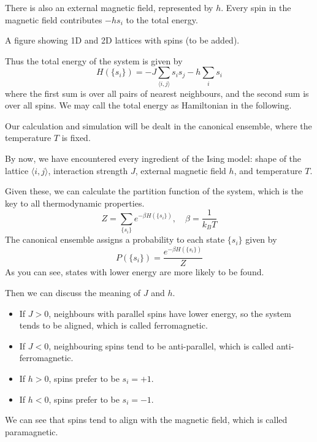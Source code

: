 \documentclass[11pt]{article}
\begin{document}
	There is also an external magnetic field, represented by $h$.
	Every spin in the magnetic field contributes $-h s_i$ to the total energy.

	A figure showing 1D and 2D lattices with spins (to be added).

	Thus the total energy of the system is given by
	\begin{equation} \label{eq:Hamiltonian}
		H(\{s_i\}) = -J \sum_{\langle i,j \rangle} s_i s_j - h \sum_i s_i
	\end{equation}
	where the first sum is over all pairs of nearest neighbours, and the second sum is over all spins.
	We may call the total energy as Hamiltonian in the following.
	
	Our calculation and simulation will be dealt in the canonical ensemble, where the temperature $T$ is fixed.

	By now, we have encountered every ingredient of the Ising model: 
	shape of the lattice $\langle i,j \rangle$, interaction strength $J$, external magnetic field $h$, and temperature $T$.
	
	Given these, we can calculate the partition function of the system, which is the key to all thermodynamic properties.
	\begin{equation} \label{eq:PartitionFunction}
		Z = \sum_{\{s_i\}} e^{-\beta H(\{s_i\})}, \quad \beta = \frac{1}{k_B T}
	\end{equation}
	The canonical ensemble assigns a probability to each state $\{s_i\}$ given by
	\begin{equation} \label{eq:Probability}
		P(\{s_i\}) = \frac{e^{-\beta H(\{s_i\})}}{Z}
	\end{equation}
	As you can see, states with lower energy are more likely to be found.

	Then we can discuss the meaning of $J$ and $h$.
	\begin{itemize}
		\item If $J > 0$, neighbours with parallel spins have lower energy, so the system tends to be aligned, which is called ferromagnetic.
		\item If $J < 0$, neighbouring spins tend to be anti-parallel, which is called anti-ferromagnetic.
	\end{itemize}
	\begin{itemize}
		\item If $h > 0$, spins prefer to be $s_i = +1$.
		\item If $h < 0$, spins prefer to be $s_i = -1$.
	\end{itemize}
	We can see that spins tend to align with the magnetic field, which is called paramagnetic.
\end{document}
